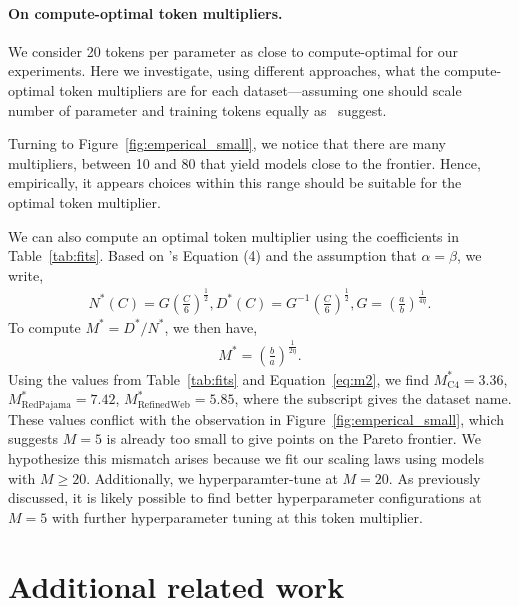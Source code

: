 \begin{appendix}
\paragraph{On compute-optimal token multipliers.}
We consider 20 tokens per parameter as close to compute-optimal for our experiments.
Here we investigate, using different approaches, what the compute-optimal token multipliers are for each dataset---assuming one should scale number of parameter and training tokens equally as~\citet{chinchilla} suggest.

Turning to Figure~\ref{fig:emperical_small}, we notice that there are many multipliers, between 10 and 80 that yield models close to the frontier.
Hence, empirically, it appears choices within this range should be suitable for the optimal token multiplier.

We can also compute an optimal token multiplier using the coefficients in Table~\ref{tab:fits}.
Based on \citet{chinchilla}'s Equation (4) and the assumption that $\alpha=\beta$, we write,
\begin{align}
\label{eq:m1}
N^*(C) = G \left( \frac{C}{6} \right)^{\frac{1}{2}}, D^*(C) = G^{-1} \left( \frac{C}{6} \right)^{\frac{1}{2}}, G = \left( \frac{a}{b}\right)^{\frac{1}{4\eta}}.
\end{align}
To compute $M^* = D^*/N^*$, we then have,
\begin{align}
\label{eq:m2}
M^* = \left( \frac{b}{a}\right)^{\frac{1}{2\eta}}.
\end{align}
Using the values from Table~\ref{tab:fits} and Equation~\eqref{eq:m2}, we find $M^*_{\text{C4}}=3.36$, $M^*_{\text{RedPajama}}=7.42$, $M^*_{\text{RefinedWeb}}=5.85$, where the subscript gives the dataset name.
These values conflict with the observation in Figure~\ref{fig:emperical_small}, which suggests $M=5$ is already too small to give points on the Pareto frontier.
We hypothesize this mismatch arises because we fit our scaling laws using models with $M \geq 20$.
Additionally, we hyperparamter-tune at $M=20$.
As previously discussed, it is likely possible to find better hyperparameter configurations at $M=5$ with further hyperparameter tuning at this token multiplier.

\section{Additional related work}
\label{appx:added_related}


\end{appendix}

